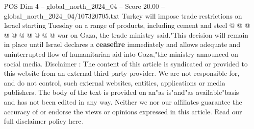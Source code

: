\begin{textsample}{POS Dim 4 – global\_north\_2024\_04 – Score 20.00 – global\_north\_2024\_04/107320705.txt}
Turkey will impose trade restrictions on Israel starting Tuesday on a range of products, including cement and steel @ @ @ @ @ @ @ @ @ @ war on Gaza, the trade ministry said."This decision will remain in place until Israel declares a \textbf{ceasefire} immediately and allows adequate and uninterrupted flow of humanitarian aid into Gaza,"the ministry announced on social media.
Disclaimer : The content of this article is syndicated or provided to this website from an external third party provider.
We are not responsible for, and do not control, such external websites, entities, applications or media publishers.
The body of the text is provided on an"as is"and"as available"basis and has not been edited in any way.
Neither we nor our affiliates guarantee the accuracy of or endorse the views or opinions expressed in this article.
Read our full disclaimer policy here.

\end{textsample}
